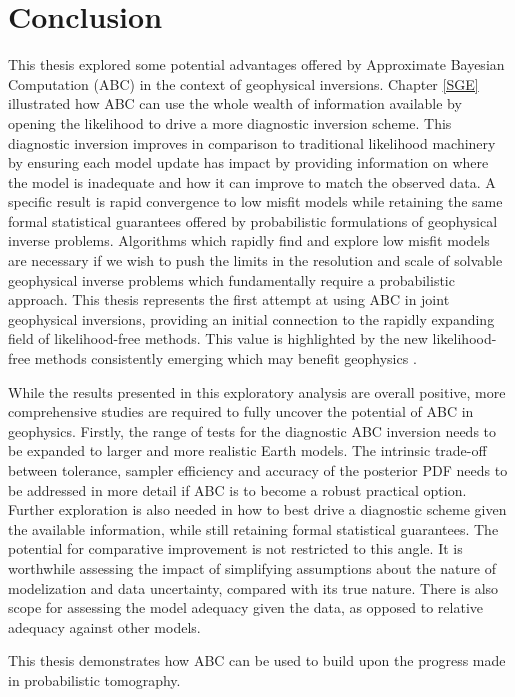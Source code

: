 

\chapter{Conclusion}

This thesis explored some potential advantages offered by Approximate Bayesian Computation (ABC) in the context of geophysical inversions. Chapter \ref{SGE} illustrated how ABC can use the whole wealth  of information available by opening the likelihood to drive a more diagnostic inversion scheme. This diagnostic inversion improves in comparison to traditional likelihood machinery by ensuring each model update has impact by providing information on where the model is inadequate and how it can improve to match the observed data. A specific result is rapid convergence to low misfit models while retaining the same formal statistical guarantees offered by probabilistic formulations of geophysical inverse problems. Algorithms which rapidly find and explore low misfit models are necessary if we wish to push the limits in the resolution and scale of solvable geophysical inverse problems which fundamentally require a probabilistic approach. This thesis represents the first attempt at using ABC in joint geophysical inversions, providing an initial connection to the rapidly expanding field of likelihood-free methods. This value is highlighted by the new likelihood-free methods consistently emerging which may benefit geophysics \citep{papamakarios2016fast,song2017nice}.\par

While the results presented in this exploratory analysis are overall positive, more comprehensive studies are required to fully uncover the potential of ABC in geophysics. Firstly, the range of tests for the diagnostic ABC inversion needs to be expanded to larger and more realistic Earth models. The intrinsic trade-off between tolerance, sampler efficiency and accuracy of the posterior PDF needs to be addressed in more detail if ABC is to become a robust practical option. Further exploration is also needed in how to best drive a diagnostic scheme given the available information, while still retaining formal statistical guarantees. The potential for comparative improvement is not restricted to this angle. It is worthwhile assessing the impact of simplifying assumptions about the nature of modelization and data uncertainty, compared with its true nature. There is also scope for assessing the model adequacy given the data, as opposed to relative adequacy against other models. \par

This thesis demonstrates how ABC can be used to build upon the progress made in probabilistic tomography.
